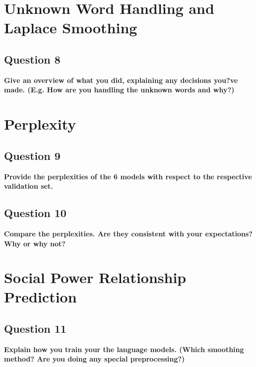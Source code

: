 \documentclass{article} %
\begin{document}
\lipsum[2] %

\section{Unknown Word Handling and Laplace Smoothing}

\subsection*{Question 8}

\textbf{Give an overview of what you did, explaining any decisions you?ve made. (E.g. How are you handling the unknown words and why?)}
\\


\lipsum[2] %

\section{Perplexity}

\subsection*{Question 9}

\textbf{Provide the perplexities of the 6 models with respect to the respective validation set.}
\\


\lipsum[2] %

\subsection*{Question 10}

\textbf{Compare the perplexities. Are they consistent with your expectations? Why or why not?}
\\

\lipsum[2]

\section{Social Power Relationship Prediction}


\subsection*{Question 11}

\textbf{Explain how you train your the language models. (Which smoothing method? Are you doing any special preprocessing?)}
\\
\end{document}
